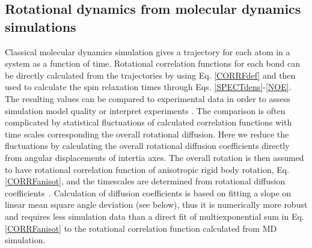 \documentclass[pre,aps,floatfix,authordate1-4,twocolumn]{revtex4-1}
\begin{document}


\subsection{Rotational dynamics from molecular dynamics simulations}\label{MDanalysis}
Classical molecular dynamics simulation gives a trajectory for each atom in
a system as a function of time. Rotational correlation functions for each bond
can be directly calculated from the trajectories by using Eq. \ref{CORRFdef}
and then used to calculate the spin relaxation times through Eqs. \ref{SPECTdens}-\ref{NOE}.
The resulting values can be compared to experimental data in order to assess simulation model
quality \cite{best04,showalter07a,showalter07b,maragakis08,trbovic08,fisette12} or
interpret experiments \cite{fisette12}. The comparison is often complicated by
statistical fluctuations of calculated correlation functions with time scales
corresponding the overall rotational diffusion. 
Here we reduce the fluctuations by calculating the overall rotational diffusion coefficients
directly from angular displacements of intertia axes.
The overall rotation is then assumed to have rotational correlation function of anisotropic rigid body
rotation, Eq. \ref{CORRFanisot}, and the timescales are determined from 
rotational diffusion coefficients~\cite{Note1}. Calculation of diffusion coefficients is
based on fitting a slope on linear mean square angle deviation (see below),
thus it is numerically more robust and requires less simulation data than a direct fit of
multiexponential sum in Eq. \ref{CORRFanisot} to the rotational correlation function calculated from MD
simulation.
\end{document}
